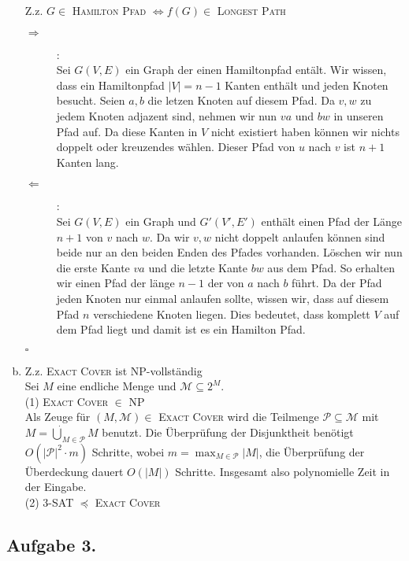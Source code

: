 \documentclass[11pt,a4paper,ngerman]{article}
\begin{document}
\begin{enumerate}[a)]
Z.z. $G \in $ \textsc{Hamilton Pfad} $\Leftrightarrow f(G) \in $ \textsc{Longest Path}\\
\begin{description}
    \item[$\Rightarrow$]:\\
        Sei $G(V,E)$ ein Graph der einen Hamiltonpfad entält.
        Wir wissen, dass ein Hamiltonpfad $|V| = n-1$ Kanten enthält und jeden Knoten besucht.
        Seien $a,b$ die letzen Knoten auf diesem Pfad. Da $v,w$ zu jedem Knoten adjazent sind, nehmen wir nun $va$ und $bw$ in unseren
        Pfad auf. Da diese Kanten in $V$ nicht existiert haben können wir nichts doppelt oder kreuzendes wählen.
        Dieser Pfad von $u$ nach $v$ ist $n+1$ Kanten lang.
    \item[$\Leftarrow$]:\\
        Sei $G(V,E)$ ein Graph und $G'(V',E')$ enthält einen Pfad der Länge $n+1$ von $v$ nach $w$.
        Da wir $v,w$ nicht doppelt anlaufen können sind beide nur an den beiden Enden des Pfades vorhanden.
        Löschen wir nun die erste Kante $va$ und die letzte Kante $bw$ aus dem Pfad. So erhalten wir einen Pfad der länge
        $n-1$ der von $a$ nach $b$ führt.
        Da der Pfad jeden Knoten nur einmal anlaufen sollte, wissen wir, dass auf diesem Pfad $n$ verschiedene Knoten liegen.
        Dies bedeutet, dass komplett $V$ auf dem Pfad liegt und damit ist es ein Hamilton Pfad.
\end{description}
\mbox{}\hfill $\square$


\item Z.z. \textsc{Exact Cover} ist NP-vollständig \\
Sei $M$ eine endliche Menge und $\mathcal{M} \subseteq 2^M$.\\
(1) \textsc{Exact Cover} $\in$ NP \\
Als Zeuge für $(M,\mathcal{M}) \in$ \textsc{Exact Cover} wird die Teilmenge $\mathcal{P} \subseteq \mathcal{M}$ mit $M = \dot\bigcup_{M \in \mathcal{P}} M$ benutzt. Die Überprüfung der Disjunktheit benötigt $O(|\mathcal{P}|^2 \cdot m)$ Schritte, wobei $m = \max_{M \in \mathcal{P}} |M|$, die Überprüfung der Überdeckung dauert $O(|M|)$ Schritte. Insgesamt also polynomielle Zeit in der Eingabe.\\
(2) \textsc{3-SAT} $\preceq$ \textsc{Exact Cover} \\
\end{enumerate}
\subsection*{Aufgabe 3.}
\end{document}
